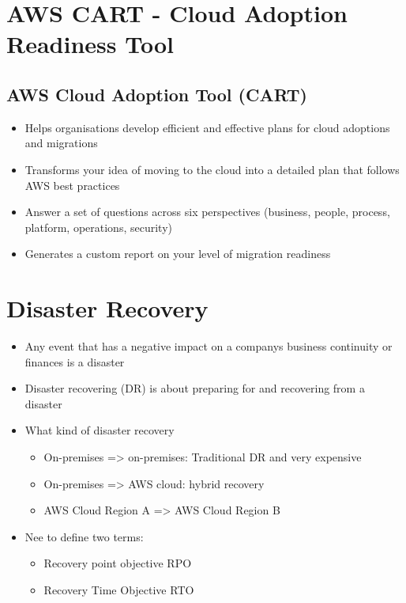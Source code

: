 {{\section{AWS CART - Cloud Adoption Readiness Tool}

\subsection{AWS Cloud Adoption Tool (CART)}
\begin{itemize}
    \item Helps organisations develop efficient and effective plans for cloud adoptions and migrations
    \item Transforms your idea of moving to the cloud into a detailed plan that follows AWS best practices
    \item Answer a set of questions across six perspectives (business, people, process, platform, operations, security)
    \item Generates a custom report on your level of migration readiness
\end{itemize}


\section{Disaster Recovery}
\begin{itemize}
    \item Any event that has a negative impact on a companys business continuity or finances is a disaster
    \item Disaster recovering (DR) is about preparing for and recovering from a disaster
    \item What kind of disaster recovery
    \begin{itemize}
        \item On-premises => on-premises: Traditional DR and very expensive
        \item On-premises => AWS cloud: hybrid recovery
        \item AWS Cloud Region A => AWS Cloud Region B
    \end{itemize}
    \item Nee to define two terms:
    \begin{itemize}
        \item Recovery point objective RPO
        \item Recovery Time Objective RTO
    \end{itemize}
\end{itemize}

}}
